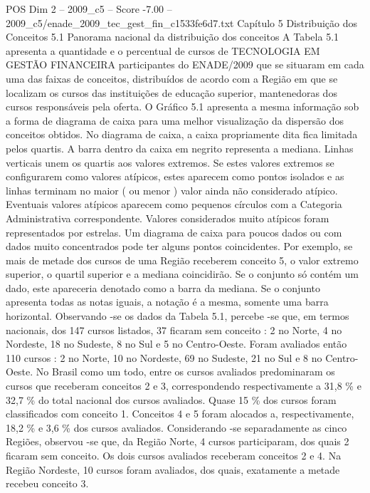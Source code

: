 \begin{textsample}{POS Dim 2 – 2009\_c5 – Score -7.00 – 2009\_c5/enade\_2009\_tec\_gest\_fin\_c1533fe6d7.txt}  \label{ex:f2_pos_416}
Capítulo 5 Distribuição dos Conceitos 5.1 Panorama nacional da distribuição dos conceitos A Tabela 5.1 apresenta a quantidade e o percentual de cursos de TECNOLOGIA EM GESTÃO FINANCEIRA participantes do ENADE/2009 que se situaram em cada uma das faixas de conceitos, distribuídos de acordo com a Região em que se localizam os cursos das instituições de educação superior, mantenedoras dos cursos responsáveis pela oferta.
O Gráfico 5.1 apresenta a mesma informação sob a forma de diagrama de caixa para uma melhor visualização da dispersão dos conceitos obtidos.
No diagrama de caixa, a caixa propriamente dita fica limitada pelos quartis.
A barra dentro da caixa em negrito representa a mediana.
Linhas verticais unem os quartis aos valores extremos.
Se estes valores extremos se configurarem como valores atípicos, estes aparecem como pontos isolados e as linhas terminam no maior ( ou menor ) valor ainda não considerado atípico.
Eventuais valores atípicos aparecem como pequenos círculos com a Categoria Administrativa correspondente.
Valores considerados muito atípicos foram representados por estrelas.
Um diagrama de caixa para poucos dados ou com dados muito concentrados pode ter alguns pontos coincidentes.
Por exemplo, se mais de metade dos cursos de uma Região receberem conceito 5, o valor extremo superior, o quartil superior e a mediana coincidirão.
Se o conjunto só contém um dado, este apareceria denotado como a barra da mediana.
Se o conjunto apresenta todas as notas iguais, a notação é a mesma, somente uma barra horizontal.
Observando -se os dados da Tabela 5.1, percebe -se que, em termos nacionais, dos 147 cursos listados, 37 ficaram sem conceito : 2 no Norte, 4 no Nordeste, 18 no Sudeste, 8 no Sul e 5 no Centro-Oeste.
Foram avaliados então 110 cursos : 2 no Norte, 10 no Nordeste, 69 no Sudeste, 21 no Sul e 8 no Centro-Oeste.
No Brasil como um todo, entre os cursos avaliados predominaram os cursos que receberam conceitos 2 e 3, correspondendo respectivamente a 31,8 \% e 32,7 \% do total nacional dos cursos avaliados.
Quase 15 \% dos cursos foram classificados com conceito 1.
Conceitos 4 e 5 foram alocados a, respectivamente, 18,2 \% e 3,6 \% dos cursos avaliados.
Considerando -se separadamente as cinco Regiões, observou -se que, da Região Norte, 4 cursos participaram, dos quais 2 ficaram sem conceito.
Os dois cursos avaliados receberam conceitos 2 e 4.
Na Região Nordeste, 10 cursos foram avaliados, dos quais, exatamente a metade recebeu conceito 3.

\end{textsample}
